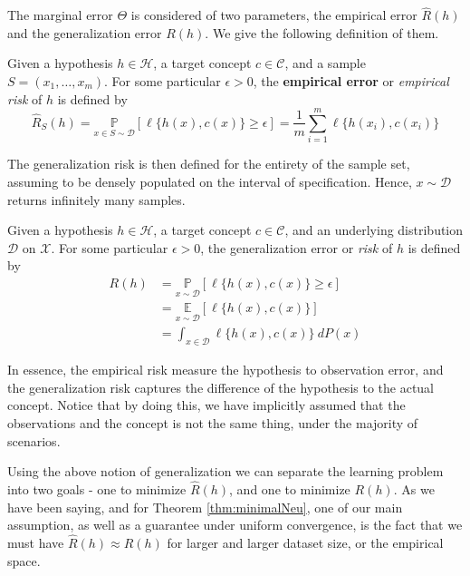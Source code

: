 \documentclass[
  journal=largetwo,
  year=2025,
  volume=37,
]{cup-journal}
\begin{document}
The marginal error $\Theta$ is considered of two parameters, the empirical error $\hat{R}(h)$ and the generalization error $R(h)$. We give the following definition of them. 

\begin{definition}
    Given a hypothesis $h\in \mathcal{H}$, a target concept $c\in \mathcal{C}$, and a sample $S=(x_{1},\dots,x_{m})$. For some particular $\epsilon>0$, the \textbf{empirical error} or \textit{empirical risk} of $h$ is defined by\begin{equation}
        \hat{R}_{S}(h) = \underset{x\in S\sim\mathcal{D}}{\mathbb{P}} [\ell\{h(x),c(x)\}\geq \epsilon] =\frac{1}{m} \sum_{i=1}^{m} \ell\{h(x_i),c(x_i)\}
    \end{equation}
\end{definition}

The generalization risk is then defined for the entirety of the sample set, assuming to be densely populated on the interval of specification. Hence, $x\sim \mathcal{D}$ returns infinitely many samples. 

\begin{definition}
    Given a hypothesis $h\in\mathcal{H}$, a target concept $c\in\mathcal{C}$, and an underlying distribution $\mathcal{D}$ on $\mathcal{X}$. For some particular $\epsilon>0$, the generalization error or \textit{risk} of $h$ is defined by
    \begin{equation}
        \begin{split}
          R(h) 
          &= \underset{x\sim\mathcal{D}}{\mathbb{P}} [\ell\{h(x),c(x)\}\geq \epsilon]\\
          &= \underset{x\sim\mathcal{D}}{\mathbb{E}}[\ell\{h(x),c(x)\}]\\ 
          &= \int_{x\in \mathcal{D}} \ell\{h(x),c(x)\} \: dP(x)
        \end{split}
    \end{equation}
\end{definition}

In essence, the empirical risk measure the hypothesis to observation error, and the generalization risk captures the difference of the hypothesis to the actual concept. Notice that by doing this, we have implicitly assumed that the observations and the concept is not the same thing, under the majority of scenarios.

Using the above notion of generalization we can separate the learning problem into two goals - one to minimize $\hat{R}(h)$, and one to minimize $R(h)$. As we have been saying, and for Theorem \ref{thm:minimalNeu}, one of our main assumption, as well as a guarantee under uniform convergence, is the fact that we must have $\hat{R}(h)\approx R(h)$ for larger and larger dataset size, or the empirical space. 
\end{document}
